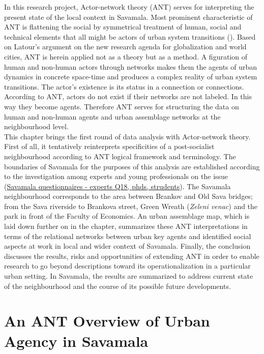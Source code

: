 \documentclass[11pt]{report}
\begin{document}
In this research project, Actor-network theory (ANT) serves for interpreting the present state of the local context in Savamala.
Most prominent characteristic of ANT is flattening the social by symmetrical treatment of human, social and technical elements that all might be actors of urban system transitions (\cite{Latour, 2005}). 
Based on Latour’s argument on the new research agenda for globalization and world cities, ANT is herein applied not as a theory but as a method.
A figuration of human and non-human actors through networks makes them the agents of urban dynamics in concrete space-time and produces a complex reality of urban system transitions. 
The actor’s existence is its status in a connection or connections.
According to ANT, actors do not exist if their networks are not labeled.
In this way they become agents.
Therefore ANT serves for structuring the data on human and non-human agents and urban assemblage networks at the neighbourhood level.
\\

This chapter brings the first round of data analysis with Actor-network theory.
First of all, it tentatively reinterprets specificities of a post-socialist neighbourhood according to ANT logical framework and terminology. 
The boundaries of Savamala for the purposes of this analysis are established according to the investigation among experts and young professionals on the issue (\href{}{Savamala questionnaires - experts Q18, phds, strudents}).
The Savamala neighbourhood corresponds to the area between Brankov and Old Sava bridges; from the Sava riverside to Brankova street, Green Wreath (\textit{Zeleni venac}) and the park in front of the Faculty of Economics.
An urban assemblage map, which is laid down further on in the chapter, summarizes these ANT interpretations in terms of the relational networks between urban key agents and identified social aspects at work in local and wider context of Savamala.
Finally, the conclusion discusses the results, risks and opportunities of extending ANT in order to enable research to go beyond descriptions toward its operationalization in a particular urban setting.
In Savamala, the results are summarized to address current state of the neighbourhood and the course of its possible future developments.

\section{An ANT Overview of Urban Agency in Savamala}
\end{document}
